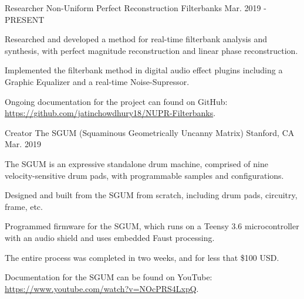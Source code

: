 \begin{cventries}
    \cventry
    {Researcher} %
    {Non-Uniform Perfect Reconstruction Filterbanks} %
    {} %
    {Mar. 2019 - PRESENT} %
    {
      \begin{cvitems} %
        \item {Researched and developed a method for real-time filterbank analysis and synthesis, with perfect magnitude reconstruction and linear phase reconstruction.}
        \item {Implemented the filterbank method in digital audio effect plugins including a Graphic Equalizer and a real-time Noise-Supressor.}
        \item {Ongoing documentation for the project can found on GitHub: \url{https://github.com/jatinchowdhury18/NUPR-Filterbanks}.}
      \end{cvitems}
    }

    \cventry
    {Creator} %
    {The SGUM (Squaminous Geometrically Uncanny Matrix)} %
    {Stanford, CA} %
    {Mar. 2019} %
    {
      \begin{cvitems} %
        \item {The SGUM is an expressive standalone drum machine, comprised of nine velocity-sensitive drum pads, with programmable samples and configurations.}
        \item {Designed and built from the SGUM from scratch, including drum pads, circuitry, frame, etc.}
        \item {Programmed firmware for the SGUM, which runs on a Teensy 3.6 microcontroller with an audio shield and uses embedded Faust processing.}
        \item {The entire process was completed in two weeks, and for less that \$100 USD.}
        \item {Documentation for the SGUM can be found on YouTube: \url{https://www.youtube.com/watch?v=NOcPRS4LxpQ}.}
      \end{cvitems}
    }


\end{cventries}
